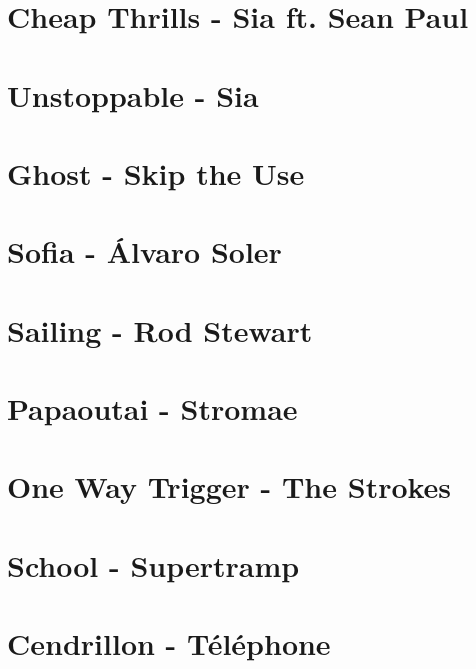 \documentclass[11pt]{article}
\begin{document}
\section{Cheap Thrills - Sia ft. Sean Paul}


\section{Unstoppable - Sia}
\begin{guitar}

\end{guitar}

\section{Ghost - Skip the Use}


\section{Sofia - Álvaro Soler}
\begin{guitar}

\end{guitar}

\section{Sailing - Rod Stewart}


\section{Papaoutai - Stromae}


\section{One Way Trigger - The Strokes}


\section{School - Supertramp}



\section{Cendrillon - Téléphone}
\begin{guitar}

\end{guitar}
\end{document}
